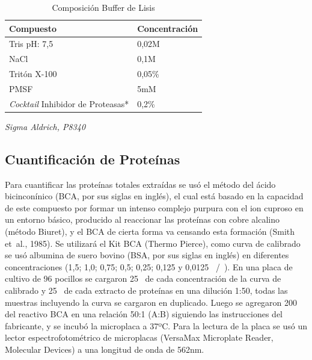 \documentclass[12pt,letterpaper,oneside]{scrbook}
\begin{document}
\begin{table}[h!]
    \begin{center}
        \begin{threeparttable}
            \caption{Composición Buffer de Lisis}\label{tablabufferlisis}
            \begin{tabularx}{10cm}{X l}
                \toprule
                Compuesto & Concentración \\
                \midrule
                Tris pH: 7,5 & 0,02M \\
                NaCl & 0,1M \\
                Tritón X-100 & 0,05\% \\
                PMSF & 5mM \\
                \emph{Cocktail} Inhibidor de Proteasas* & 0,2\% \\
                \bottomrule
            \end{tabularx}
            \begin{tablenotes}
                \item *\emph{Sigma Aldrich, P8340}
            \end{tablenotes}
        \end{threeparttable}
    \end{center}
\end{table}

\subsection{Cuantificación de Proteínas}
\label{cuantificacionbca}

Para cuantificar las proteínas totales extraídas se usó el método del
ácido bicinconínico (BCA, por sus siglas en inglés), el cual está basado
en la capacidad de este compuesto por formar un intenso complejo purpura
con el ion cuproso en un entorno básico, producido al reaccionar las
proteínas con cobre alcalino (método Biuret), y el BCA de cierta forma
va censando esta formación (Smith et~al., 1985). Se utilizará el Kit BCA
(Thermo Pierce), como curva de calibrado se usó albumina de suero bovino
(BSA, por sus siglas en inglés) en diferentes concentraciones (1,5; 1,0;
0,75; 0,5; 0,25; 0,125 y 0,0125 \si{\micro\gramo}/\si{\micro\litro}). En
una placa de cultivo de 96 pocillos se cargaron 25\si{\micro\litro} de
cada concentración de la curva de calibrado y 25\si{\micro\litro} de
cada extracto de proteínas en una dilución 1:50, todas las muestras
incluyendo la curva se cargaron en duplicado. Luego se agregaron 200
\si{\micro\litro} del reactivo BCA en una relación 50:1 (A:B) siguiendo
las instrucciones del fabricante, y se incubó la microplaca a 37ºC. Para
la lectura de la placa se usó un lector espectrofotométrico de
microplacas (VersaMax Microplate Reader, Molecular Devices) a una
longitud de onda de 562nm.
\end{document}

